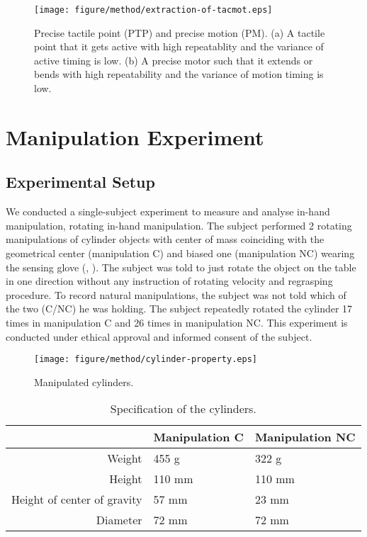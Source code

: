 \documentclass[letterpaper, 10 pt, conference]{IEEEtran}  %
\begin{document}
\begin{figure}[t!]
 \centering
  \texttt{[image: figure/method/extraction-of-tacmot.eps]}
  \caption{Precise tactile point (PTP) and precise motion (PM). (a) A tactile point that it gets active with high repeatablity and the variance of active timing is low. (b) A precise motor such that it extends or bends with high repeatability and the variance of motion timing is low.}
 \label{fig:way-to-extract}
\end{figure}


\section{Manipulation Experiment}
\subsection{Experimental Setup}
We conducted a single-subject experiment to measure and analyse in-hand manipulation, rotating in-hand manipulation. The subject performed 2 rotating manipulations of cylinder objects with center of mass coinciding with the geometrical center (manipulation C) and biased one (manipulation NC) wearing the sensing glove (, ). The subject was told to just rotate the object on the table in one direction without any instruction of rotating velocity and regrasping procedure. To record natural manipulations, the subject was not told which of the two (C/NC) he was holding. The subject repeatedly rotated the cylinder 17 times in manipulation C and 26 times in manipulation NC. This experiment is conducted under ethical approval and informed consent of the subject.

\begin{figure}[t!]
 \centering
 \texttt{[image: figure/method/cylinder-property.eps]}
 \caption{Manipulated cylinders.} 
 \label{fig:cylinder}
\end{figure}

\begin{table}[t!]
 \centering
 \caption{Specification of the cylinders.}
      \begin{tabular}{|r||l|l|} \hline
               & Manipulation C & Manipulation NC \\ \hline \hline
              Weight & 455 g & 322 g \\ \hline
              Height & 110 mm & 110 mm \\ \hline
              Height of center of gravity & 57 mm & 23 mm \\ \hline
              Diameter & 72 mm & 72 mm \\ \hline
            \end{tabular}
    \label{tab:specification-of-robot}
\end{table}
\end{document}
